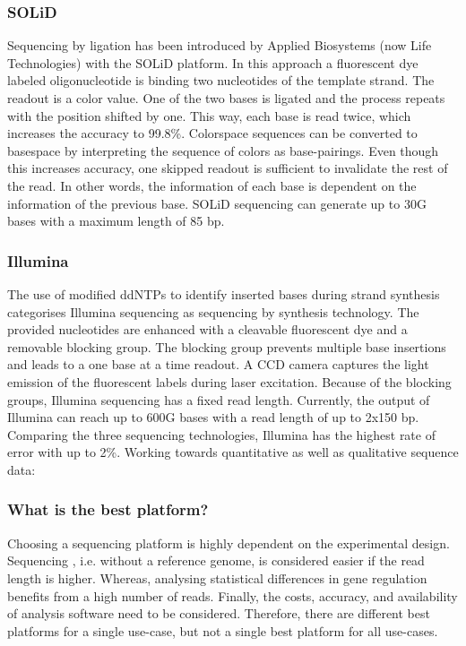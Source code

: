 \subsubsection{SOLiD}
Sequencing by ligation has been introduced by Applied Biosystems (now Life Technologies) with the SOLiD platform.
In this approach a fluorescent dye labeled oligonucleotide is binding two nucleotides of the template strand.
The readout is a color value.
One of the two bases is ligated and the process repeats with the position shifted by one.
This way, each base is read twice, which increases the accuracy to 99.8\%.
Colorspace sequences can be converted to basespace by interpreting the sequence of colors as base-pairings.
Even though this increases accuracy, one skipped readout is sufficient to invalidate the rest of the read.
In other words, the information of each base is dependent on the information of the previous base.
SOLiD sequencing can generate up to 30G bases with a maximum length of 85 bp.

\subsubsection{Illumina}
The use of modified ddNTPs to identify inserted bases during strand synthesis categorises Illumina sequencing as sequencing by synthesis technology.
The provided nucleotides are enhanced with a cleavable fluorescent dye and a removable blocking group.
The blocking group prevents multiple base insertions and leads to a one base at a time readout.
A CCD camera captures the light emission of the fluorescent labels during laser excitation.
Because of the blocking groups, Illumina sequencing has a fixed read length.
Currently, the output of Illumina can reach up to 600G bases with a read length of up to 2x150 bp.
Comparing the three sequencing technologies, Illumina has the highest rate of error with up to 2\%.
Working towards quantitative as well as qualitative sequence data:

\subsubsection{What is the best platform?}
Choosing a sequencing platform is highly dependent on the experimental design.
Sequencing , i.e. without a reference genome, is considered easier if the read length is higher.
Whereas, analysing statistical differences in gene regulation benefits from a high number of reads.
Finally, the costs, accuracy, and availability of analysis software need to be considered.
Therefore, there are different best platforms for a single use-case, but not a single best platform for all use-cases.

